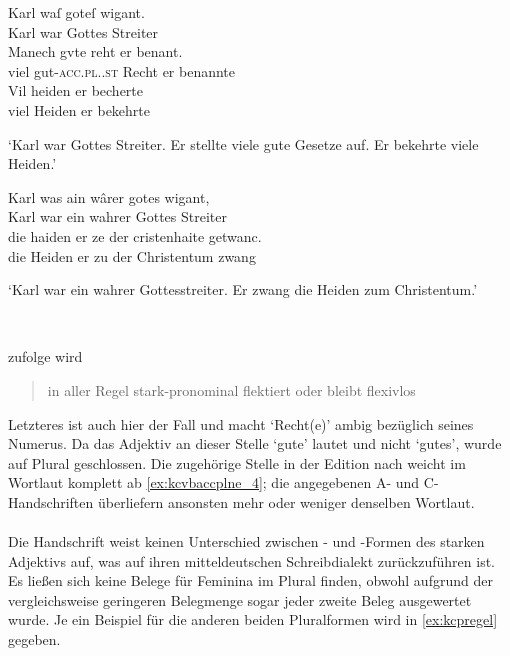\begin{exe}
\ex \label{ex:kcvbaccplne}
	\begin{xlist}
	\ex \gll Karl waſ goteſ wigant. \\
			Karl war Gottes Streiter \\
	\sn \gll Manech gvte reht er benant. \\
			viel gut-\textsc{acc.pl.\NeutI.st} Recht er benannte \\
	\sn \gll Vil heiden er becherte \\
			viel Heiden er bekehrte \\
		\begin{taggedline}{\parencites[\pno~100\vb, 13--15]{kc:VB}[vgl.][40\va,
		10--12]{kc:B1}}
		\trans `Karl war Gottes Streiter. Er stellte viele gute
			Gesetze auf. Er bekehrte viele Heiden.'
		\end{taggedline}
		\label{ex:kcvbaccplne_2}

	\ex \gll Karl was ain wârer gotes wigant, \\
			Karl war ein wahrer Gottes Streiter \\
	\sn \gll die haiden er ze der cristenhaite getwanc. \\
			die Heiden er zu der Christentum zwang \\
		\begin{taggedline}{%
			\parencites[15073--15074]{schroeder1895}[vgl.]%
			[\pno~64\va, 37--38]{kc:A1}%
			[\pno~115\va, 13--14]{kc:M}%
			[\pno~92\ra, 1--2]{kc:H}%
			[\pno~78\rb, 34]{kc:C1}%
			[\pno~89\rb, 26--27]{kc:K}%
			[\pno~304\va, 4--5]{kc:Z}%
		}
		\trans `Karl war ein wahrer Gottesstreiter. Er zwang die Heiden
			zum Christentum.'
		\end{taggedline}
		\label{ex:kcvbaccplne_4}
		\\
	\end{xlist}
\end{exe}

\citeauthor{ksw2} zufolge wird  \blockcquote[585]{ksw2}{in
aller Regel stark-pronominal flektiert oder bleibt flexivlos}. Letzteres ist
auch hier der Fall und macht  `Recht(e)' ambig bezüglich seines
Numerus. Da das Adjektiv an dieser Stelle  `gute' lautet und
nicht  `gutes', wurde auf Plural geschlossen. Die zugehörige
Stelle in der Edition nach \citet{kc:A1} weicht im Wortlaut komplett ab
\cref{ex:kcvbaccplne_4}; die angegebenen A- und C-Handschriften überliefern
ansonsten mehr oder weniger denselben Wortlaut.

\paragraph{\citet{kc:P}}
Die Handschrift \citet{kc:P} weist keinen Unterschied zwischen - und
-Formen des starken Adjektivs auf, was auf ihren mitteldeutschen
Schreibdialekt zurückzuführen ist. Es ließen sich keine Belege für Feminina im
Plural finden, obwohl aufgrund der vergleichsweise geringeren Belegmenge sogar
jeder zweite Beleg ausgewertet wurde. Je ein Beispiel für die anderen beiden
Pluralformen wird in \cref{ex:kcpregel} gegeben.


